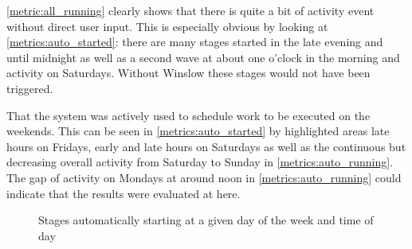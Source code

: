 \autoref{metric:all_running} clearly shows that there is quite a bit of activity event without direct user input.
This is especially obvious by looking at \autoref{metrics:auto_started}: there are many stages started in the late evening and until midnight as well as a second wave at about one o'clock in the morning and activity on Saturdays.
Without Winslow these stages would not have been triggered.

That the system was actively used to schedule work to be executed on the weekends.
This can be seen in \autoref{metrics:auto_started} by highlighted areas late hours on Fridays, early and late hours on Saturdays as well as the continuous but decreasing overall activity from Saturday to Sunday in \autoref{metrics:auto_running}.
The gap of activity on Mondays at around noon in \autoref{metrics:auto_running} could indicate that the results were evaluated at here.

\begin{figure}[H]
	\centering
	\caption{Stages automatically starting at a given day of the week and time of day}
	\label{metrics:auto_started}
\end{figure}




